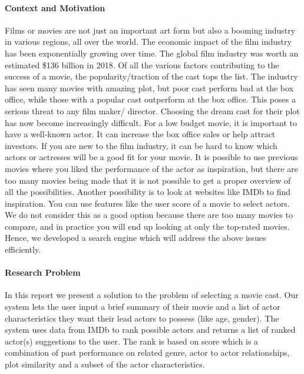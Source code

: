 
\noindent

\paragraph{Context and Motivation}
Films or movies are not just an important art form but also a booming industry in various regions, all over the world. The economic impact of the film industry has been exponentially growing over time. The global film industry was worth an estimated \$136 billion in 2018. Of all the various factors contributing to the success of a movie, the popularity/traction of the cast tops the list. The industry has seen many movies with amazing plot, but poor cast perform bad at the box office, while those with a popular cast outperform at the box office. This poses a serious threat to any film maker/ director. Choosing the dream cast for their plot has now become increasingly difficult. For a low budget movie, it is important to have a well-known actor. It can increase the box office sales or help attract investors\cite{StephenFollows}. If you are new to the film industry, it can be hard to know which actors or actresses will be a good fit for your movie. It is possible to use previous movies where you liked the performance of the actor as inspiration, but there are too many movies being made that it is not possible to get a proper overview of all the possibilities. Another possibility is to look at websites like IMDb\cite{IMDb} to find inspiration. You can use features like the user score of a movie to select actors. We do not consider this as a good option because there are too many movies to compare, and in practice you will end up looking at only the top-rated movies. Hence, we developed a search engine which will address the above issues efficiently.

\paragraph{Research Problem}
In this report we present a solution to the problem of selecting a movie cast. Our system lets the user input a brief summary of their movie and a list of actor characteristics they want their lead actors to possess (like age, gender). The system uses data from IMDb to rank possible actors and returns a list of ranked actor(s) suggestions to the user. The rank is based on score which is a combination of past performance on related genre, actor to actor relationships, plot similarity and a subset of the actor characteristics.

